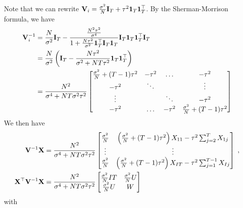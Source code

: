 \documentclass[10pt]{article}
\begin{document}
Note that we can rewrite $\mathbf{V}_i=\frac{\sigma^2}{N}\mathbf{I}_T+\tau^2\mathbf{1}_T\mathbf{1}_T^\top$. By the Sherman-Morrison formula, we have
\begin{align*}
\mathbf{V}_i^{-1} &= \frac{N}{\sigma^2}\mathbf{I}_T - \frac{\frac{N^2\tau^2}{\sigma^4}}{1+\frac{N\tau^2}{\sigma^2}\mathbf{1}_T^\top\mathbf{I}_T\mathbf{1}_T}\mathbf{I}_T\mathbf{1}_T\mathbf{1}_T^\top\mathbf{I}_T \\
&= \frac{N}{\sigma^2}\left(\mathbf{I}_T - \frac{N\tau^2}{\sigma^2+NT\tau^2}\mathbf{1}_T\mathbf{1}_T^\top\right) \\
&= \frac{N^2}{\sigma^4+NT\sigma^2\tau^2}
\begin{bmatrix}
\frac{\sigma^2}{N}+(T-1)\tau^2 & -\tau^2 & \ldots & -\tau^2 \\
-\tau^2 & \ddots & & \vdots \\
\vdots & & \ddots & -\tau^2 \\
-\tau^2 & \ldots & -\tau^2 & \frac{\sigma^2}{N}+(T-1)\tau^2
\end{bmatrix}
\end{align*}
We then have
\begin{align*}
\mathbf{V}^{-1}\mathbf{X} &= \frac{N^2}{\sigma^4+NT\sigma^2\tau^2}
\begin{bmatrix}
\frac{\sigma^2}{N} & \left(\frac{\sigma^2}{N}+(T-1)\tau^2\right)X_{11} -\tau^2\sum_{j=2}^TX_{1j} \\
\vdots & \vdots \\
\frac{\sigma^2}{N} & \left(\frac{\sigma^2}{N}+(T-1)\tau^2\right)X_{IT} -\tau^2\sum_{j=1}^{T-1}X_{Ij}
\end{bmatrix} \;, \\
\mathbf{X}^\top\mathbf{V}^{-1}\mathbf{X} &= \frac{N^2}{\sigma^4+NT\sigma^2\tau^2}
\begin{bmatrix}
\frac{\sigma^2}{N}IT & \frac{\sigma^2}{N}U \\
\frac{\sigma^2}{N}U & W
\end{bmatrix}
\end{align*}
with
\end{document}
